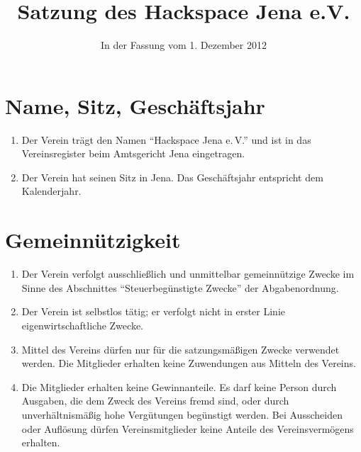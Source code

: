 \documentclass[fontsize=12pt,paper=a4,pagesize,headings=small]{scrartcl}
\title{Satzung des Hackspace Jena e.V.}
\date{In der Fassung vom 1. Dezember 2012}
\begin{document}
\maketitle{}


\section{Name, Sitz, Geschäftsjahr}

\begin{enumerate}
	\item Der Verein trägt den Namen "`Hackspace Jena e.\,V."' und ist in das
		Vereinsregister beim Amtsgericht Jena eingetragen.
	\item Der Verein hat seinen Sitz in Jena. Das Geschäftsjahr entspricht
		dem Kalenderjahr.
\end{enumerate}

\section{Gemeinnützigkeit}

\begin{enumerate}
	\item Der Verein verfolgt ausschließlich und unmittelbar gemeinnützige
		Zwecke im Sinne des Abschnittes "`Steuerbegünstigte Zwecke"' der
		Abgabenordnung.
	\item Der Verein ist selbstlos tätig; er verfolgt nicht in erster Linie
		eigenwirtschaftliche Zwecke.
	\item Mittel des Vereins dürfen nur für die satzungsmäßigen Zwecke
		verwendet werden. Die Mitglieder erhalten keine Zuwendungen aus
		Mitteln des Vereins.
	\item Die Mitglieder erhalten keine Gewinnanteile. Es darf keine Person
		durch Ausgaben, die dem Zweck des Vereins fremd sind, oder durch
		unverhältnismäßig hohe Vergütungen begünstigt werden. Bei
		Ausscheiden oder Auflösung dürfen Vereinsmitglieder keine Anteile
		des Vereinsvermögens erhalten.
\end{enumerate}

\newpage
\end{document}
